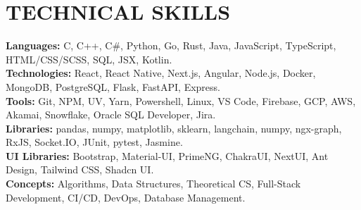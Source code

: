 \documentclass[a4paper,11pt]{article}
\begin{document}
\section{\textbf{TECHNICAL SKILLS}}
 \begin{itemize}[leftmargin=0.15in, label={}]
    \small{\item{
     \textbf{Languages:}{ C, C++, C\#, Python, Go, Rust, Java, JavaScript, TypeScript, HTML/CSS/SCSS, SQL, JSX, Kotlin.} \\
     \textbf{Technologies:}{ React, React Native, Next.js, Angular, Node.js, Docker, MongoDB, PostgreSQL, Flask, FastAPI, Express.} \\
     \textbf{Tools:}{ Git, NPM, UV, Yarn, Powershell, Linux, VS Code, Firebase, GCP, AWS, Akamai, Snowflake, Oracle SQL Developer, Jira.} \\
     \textbf{Libraries:}{ pandas, numpy, matplotlib, sklearn, langchain, numpy, ngx-graph, RxJS, Socket.IO, JUnit, pytest, Jasmine.} \\
     \textbf{UI Libraries:}{ Bootstrap, Material-UI, PrimeNG, ChakraUI, NextUI, Ant Design, Tailwind CSS, Shadcn UI.} \\
     \textbf{Concepts:}{ Algorithms, Data Structures, Theoretical CS, Full-Stack Development, CI/CD, DevOps, Database Management.} \\
    }}
 \end{itemize}
\end{document}

